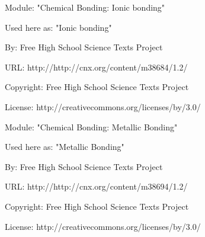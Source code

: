      \par\vspace{9pt}\noindent\begin{minipage}{\textwidth}
      Module: "Chemical Bonding: Ionic bonding" \par\nopagebreak\noindent
      Used here as: "Ionic bonding" \par\nopagebreak\noindent
        By: Free High School Science Texts Project\par\nopagebreak\noindent
      URL: http://http://cnx.org/content/m38684/1.2/\par\nopagebreak\noindent
      \par\nopagebreak\noindent
      Copyright: Free High School Science Texts Project\par\nopagebreak\noindent
      License:  http://creativecommons.org/licenses/by/3.0/\par\nopagebreak\noindent
      \par\end{minipage}
      \par\vspace{9pt}\noindent\begin{minipage}{\textwidth}
      Module: "Chemical Bonding: Metallic Bonding" \par\nopagebreak\noindent
      Used here as: "Metallic Bonding" \par\nopagebreak\noindent
        By: Free High School Science Texts Project\par\nopagebreak\noindent
      URL: http://http://cnx.org/content/m38694/1.2/\par\nopagebreak\noindent
      \par\nopagebreak\noindent
      Copyright: Free High School Science Texts Project\par\nopagebreak\noindent
      License:  http://creativecommons.org/licenses/by/3.0/\par\nopagebreak\noindent
      \par\end{minipage}
